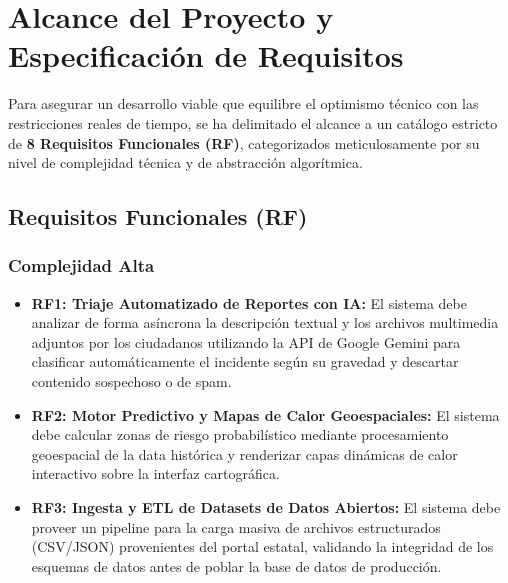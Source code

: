 \documentclass[conference]{IEEEtran}
\begin{document}
\section{Alcance del Proyecto y Especificación de Requisitos}
Para asegurar un desarrollo viable que equilibre el optimismo técnico con las restricciones reales de tiempo, se ha delimitado el alcance a un catálogo estricto de \textbf{8 Requisitos Funcionales (RF)}, categorizados meticulosamente por su nivel de complejidad técnica y de abstracción algorítmica.

\subsection{Requisitos Funcionales (RF)}

\subsubsection{\textbf{Complejidad Alta}}
\begin{itemize}
    \item \textbf{RF1: Triaje Automatizado de Reportes con IA:} El sistema debe analizar de forma asíncrona la descripción textual y los archivos multimedia adjuntos por los ciudadanos utilizando la API de Google Gemini para clasificar automáticamente el incidente según su gravedad y descartar contenido sospechoso o de spam.
    \item \textbf{RF2: Motor Predictivo y Mapas de Calor Geoespaciales:} El sistema debe calcular zonas de riesgo probabilístico mediante procesamiento geoespacial de la data histórica y renderizar capas dinámicas de calor interactivo sobre la interfaz cartográfica.
    \item \textbf{RF3: Ingesta y ETL de Datasets de Datos Abiertos:} El sistema debe proveer un pipeline para la carga masiva de archivos estructurados (CSV/JSON) provenientes del portal estatal, validando la integridad de los esquemas de datos antes de poblar la base de datos de producción.
\end{itemize}
\end{document}
